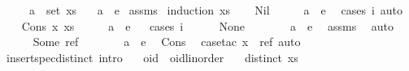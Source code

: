 \begin{isabellebody}
\ \ \ \ \ {\isachardoublequoteopen}a\ {\isasymnotin}\ set\ xs{\isachardoublequoteclose}\isanewline
\ \ \ {\isachardoublequoteopen}a\ {\isacharequal}\ e{\isachardoublequoteclose}\isanewline
%
\isadelimproof
%
\endisadelimproof
%
\isatagproof
{}\isamarkupfalse%
\ assms\ \isamarkupfalse%
{\isacharparenleft}induction\ xs{\isacharparenright}\isanewline
\ \ \isamarkupfalse%
\ Nil\isanewline
\ \ \isamarkupfalse%
\ \isamarkupfalse%
\ {\isachardoublequoteopen}a\ {\isacharequal}\ e{\isachardoublequoteclose}\ \isamarkupfalse%
\ {\isacharparenleft}cases\ i{\isacharcomma}\ auto{\isacharparenright}\isanewline
{}\isamarkupfalse%
\isanewline
\ \ \isamarkupfalse%
\ {\isacharparenleft}Cons\ x\ xs{\isacharparenright}\isanewline
\ \ \isamarkupfalse%
\ \isamarkupfalse%
\ {\isachardoublequoteopen}a\ {\isacharequal}\ e{\isachardoublequoteclose}\isanewline
\ \ \isamarkupfalse%
{\isacharparenleft}cases\ i{\isacharparenright}\isanewline
\ \ \ \ \isamarkupfalse%
\ None\isanewline
\ \ \ \ \isamarkupfalse%
\ \isamarkupfalse%
\ {\isachardoublequoteopen}a\ {\isacharequal}\ e{\isachardoublequoteclose}\ \isamarkupfalse%
\ assms\ \isamarkupfalse%
\ auto\isanewline
\ \ \isamarkupfalse%
\isanewline
\ \ \ \ \isamarkupfalse%
\ {\isacharparenleft}Some\ ref{\isacharparenright}\isanewline
\ \ \ \ \isamarkupfalse%
\ \isamarkupfalse%
\ {\isachardoublequoteopen}a\ {\isacharequal}\ e{\isachardoublequoteclose}\ \isamarkupfalse%
\ Cons\ \isamarkupfalse%
\ {\isacharparenleft}case{\isacharunderscore}tac\ {\isachardoublequoteopen}x\ {\isacharequal}\ ref{\isachardoublequoteclose}{\isacharcomma}\ auto{\isacharparenright}\isanewline
\ \ \isamarkupfalse%
\isanewline
{}\isamarkupfalse%
%
\endisatagproof
{\isafoldproof}%
%
\isadelimproof
\isanewline
%
\endisadelimproof
\isanewline
{}\isamarkupfalse%
\ insert{\isacharunderscore}spec{\isacharunderscore}distinct\ {\isacharbrackleft}intro{\isacharbrackright}{\isacharcolon}\isanewline
\ \ \ oid\ {\isacharcolon}{\isacharcolon}\ {\isachardoublequoteopen}{\isacharprime}oid{\isacharcolon}{\isacharcolon}{\isacharbraceleft}linorder{\isacharbraceright}{\isachardoublequoteclose}\isanewline
\ \ \ {\isachardoublequoteopen}distinct\ xs{\isachardoublequoteclose}\isanewline

\end{isabellebody}
